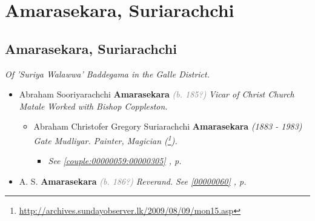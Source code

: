 \documentclass[10pt, openany]{book}
\begin{document}
\part{Amarasekara, Suriarachchi}
\chapter{Amarasekara, Suriarachchi}
\label{00000062}
\textcolor{slmaroon}{\textit{Of 'Suriya Walawwa' Baddegama in the Galle District.}}
\begin{itemize}
\item{Abraham Sooriyarachchi \textbf{Amarasekara} \textcolor{gray}{\textit{(b. 185?)}} \textcolor{slmaroon}{\textit{Vicar of Christ Church Matale Worked with Bishop Coppleston.}}
\begin{itemize}
\item{Abraham Christofer Gregory Suriarachchi \textbf{Amarasekara} \textcolor{slorange}{\textit{(1883 - 1983)}} \textcolor{slmaroon}{\textit{Gate Mudliyar.
Painter, Magician (\footnote{\url{http://archives.sundayobserver.lk/2009/08/09/mon15.asp}}).}}
\begin{itemize}
\item{\textcolor{slteal}{\textit{See  \autoref{couple:00000059:00000305} \textit{, p. \pageref{couple:00000059:00000305} }}}}
\end{itemize}
    }
\end{itemize}
  }
\item{A. S. \textbf{Amarasekara} \textcolor{gray}{\textit{(b. 186?)}} \textcolor{slmaroon}{\textit{Reverand.}} \textcolor{slteal}{\textit{See  \autoref{00000060} \textit{, p. \pageref{00000060} }}}}
\end{itemize}
 
\end{document}
